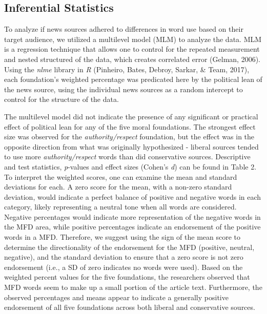 \documentclass[english,,man]{apa6}
\begin{document}
\hypertarget{inferential-statistics}{%
\subsection{Inferential Statistics}\label{inferential-statistics}}

To analyze if news sources adhered to differences in word use based on their target audience, we utilized a multilevel model (MLM) to analyze the data. MLM is a regression technique that allows one to control for the repeated measurement and nested structured of the data, which creates correlated error (Gelman, 2006). Using the \emph{nlme} library in \emph{R} (Pinheiro, Bates, Debroy, Sarkar, \& Team, 2017), each foundation's weighted percentage was predicated here by the political lean of the news source, using the individual news sources as a random intercept to control for the structure of the data.

The multilevel model did not indicate the presence of any significant or practical effect of political lean for any of the five moral foundations. The strongest effect size was observed for the \emph{authority/respect} foundation, but the effect was in the opposite direction from what was originally hypothesized - liberal sources tended to use more \emph{authority/respect} words than did conservative sources. Descriptive and test statistics, \emph{p}-values and effect sizes (Cohen's \emph{d}) can be found in Table 2. To interpret the weighted scores, one can examine the mean and standard deviations for each. A zero score for the mean, with a non-zero standard deviation, would indicate a perfect balance of positive and negative words in each category, likely representing a neutral tone when all words are considered. Negative percentages would indicate more representation of the negative words in the MFD area, while positive percentages indicate an endorsement of the positive words in a MFD. Therefore, we suggest using the sign of the mean score to determine the directionality of the endorsement for the MFD (positive, neutral, negative), and the standard deviation to ensure that a zero score is not zero endorsement (i.e., a SD of zero indicates no words were used). Based on the weighted percent values for the five foundations, the researchers observed that MFD words seem to make up a small portion of the article text. Furthermore, the observed percentages and means appear to indicate a generally positive endorsement of all five foundations across both liberal and conservative sources.
\end{document}
